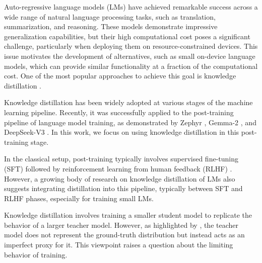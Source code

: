 Auto-regressive language models (LMs) have achieved remarkable success across a wide range of natural language processing tasks, such as translation, summarization, and reasoning. These models demonstrate impressive generalization capabilities, but their high computational cost poses a significant challenge, particularly when deploying them on resource-constrained devices. This issue motivates the development of alternatives, such as small on-device language models, which can provide similar functionality at a fraction of the computational cost. One of the most popular approaches to achieve this goal is knowledge distillation \cite{hinton2015distilling}.


Knowledge distillation has been widely adopted at various stages of the machine learning pipeline. %
Recently, it was successfully applied to the post-training pipeline of language model training, as demonstrated by Zephyr \cite{tunstall2023zephyr}, Gemma-2 \cite{team2024gemma}, and DeepSeek-V3 \cite{liu2024deepseek}. In this work, we focus on using knowledge distillation in this post-training stage.

In the classical setup, post-training typically involves supervised fine-tuning (SFT) followed by reinforcement learning from human feedback (RLHF) \cite{stiennon2020learning,ouyang2022training,bai2022training}. However, a growing body of research on knowledge distillation of LMs \cite{agarwal2024onpolicy,gu2024minillm,kim2024promptkd} also suggests integrating distillation into this pipeline, typically between SFT and RLHF phases, especially for training small LMs.




Knowledge distillation involves training a smaller student model to replicate the behavior of a larger teacher model. However, as highlighted by \cite{menon2021statistical,zhang2023not}, the teacher model does not represent the ground-truth distribution but instead acts as an imperfect proxy for it. This viewpoint raises a question about the limiting behavior of training.

